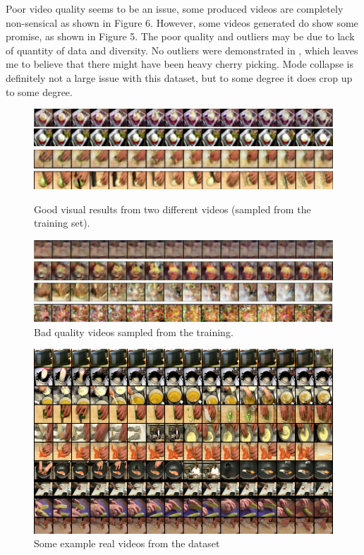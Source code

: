\documentclass{article}
\begin{document}
{{Poor video quality seems to be an issue, some produced videos are completely
non-sensical as shown in Figure 6. However, some videos generated do show
some promise, as shown in Figure 5. The poor quality and outliers may be due
to lack of quantity of data and diversity. No outliers were demonstrated in
\cite{pan_create_2018}, which leaves me to believe that there might have been
heavy cherry picking. Mode collapse is definitely not a large issue with this dataset, but to some degree it does 
crop up to some degree.

\begin{figure}[H]
    \centering
    \includegraphics[width=0.8\linewidth]{imgs/mrvdc/good_1.png}\\
    \includegraphics[width=0.8\linewidth]{imgs/mrvdc/good_2.png}
    \caption{Good visual results from two different videos (sampled from the training set).}
\end{figure}

\begin{figure}[H]
    \centering
    \includegraphics[width=0.8\linewidth]{imgs/mrvdc/bad_quality.png}
    \caption{Bad quality videos sampled from the training.}
\end{figure}

\begin{figure}[H]
    \centering
    \includegraphics[width=0.8\linewidth]{imgs/mrvdc/real_samples.png}
    \caption{Some example real videos from the dataset}
\end{figure}

}}
\end{document}
